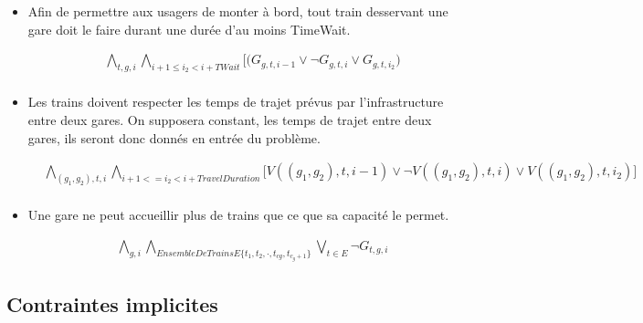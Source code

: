 \documentclass[a4paper]{article}
\begin{document}
\begin{itemize}
\item{Afin de permettre aux usagers de monter à bord, tout train desservant une gare doit
le faire durant une durée d’au moins TimeWait.}

    \begin{equation*}
    \begin{split}
      & \bigwedge_{t, g, i} \bigwedge_{i+1 \leq i_2<i+TWait} \big[
      \big(G_{g, t, i-1} \lor \neg G_{g, t, i} \lor G_{g, t, i_2} \big) \\
    \end{split}
    \end{equation*}

\item{Les trains doivent respecter les temps de trajet prévus par l’infrastructure entre deux
gares. On supposera constant, les temps de trajet entre deux gares, ils seront donc donnés en entrée du problème.}

    \begin{equation*}
    \begin{split}
      & \bigwedge_{(g_1, g_2), t, i} \bigwedge_{i+1<=i_2<i+TravelDuration} \big[ V((g_1, g_2), t, i-1) \lor \neg V((g_1, g_2), t, i) \lor V((g_1, g_2), t, i_2)\big] \\
    \end{split}
    \end{equation*}

\item{Une gare ne peut accueillir plus de trains que ce que sa capacité le permet.}

    \begin{equation*}
    \begin{split}
        & \bigwedge_{g, i} \bigwedge_{Ensemble De Trains E \{t_1, t_2, \cdot, t_{cg}, t_{c_g+1}\}} \bigvee_{t \in E} \neg G_{t, g, i}
    \end{split}
    \end{equation*}
\end{itemize}

\subsection{Contraintes implicites}
\end{document}
